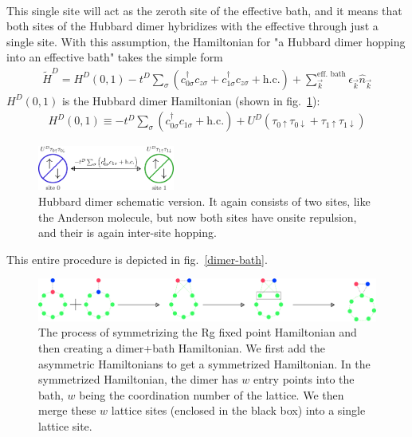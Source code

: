 \documentclass{report}
\numberwithin{equation}{section}
\begin{document}
{\begin{equation}
\begin{aligned}
 \end{aligned}\end{equation}
 This single site will act as the zeroth site of the effective bath, and it means that both sites of the Hubbard dimer hybridizes with the effective through just a single site. With this assumption, the Hamiltonian for "a Hubbard dimer hopping into an effective bath" takes the simple form
 \begin{equation}\begin{aligned}
 	\label{dimer_p_bat}
 	\tilde H^D = H^D(0,1) - t^D \sum_{\sigma}\left(c^\dagger_{0\sigma}c_{z\sigma} + c^\dagger_{1\sigma}c_{z\sigma} + \text{h.c.}\right) + \sum_{\vec k}^\text{eff. bath}\epsilon_{\vec k}\hat n_{\vec k}
 \end{aligned}\end{equation}
 \(H^D(0,1)\) is the Hubbard dimer Hamiltonian (shown in fig.~\ref{hubb-dim}):
 \begin{equation}\begin{aligned}
 	\label{dimer_ham}
 	H^D(0,1) \equiv -t^D\sum_\sigma\left( c^\dagger_{0\sigma}c_{1\sigma} + \text{h.c.} \right) + U^D\left( \tau_{0 \uparrow}\tau_{0 \downarrow} + \tau_{1 \uparrow}\tau_{1 \downarrow}\right)
 \end{aligned}\end{equation}
 \begin{figure}[htpb!]
 	\centering
 	\includegraphics[width=0.4\textwidth]{../figures/hubb_dim.png}
 	\caption{Hubbard dimer schematic version. It again consists of two sites, like the Anderson molecule, but now both sites have onsite repulsion, and their is again inter-site hopping.}
 	\label{hubb-dim}
 \end{figure}
 This entire procedure is depicted in fig.~\ref{dimer-bath}.
 \begin{figure}[htpb]
 	\centering
 	\includegraphics[width=\textwidth]{../figures/dimer_bath.pdf}
 	\caption{The process of symmetrizing the Rg fixed point Hamiltonian and then creating a dimer+bath Hamiltonian. We first add the asymmetric Hamiltonians to get a symmetrized Hamiltonian. In the symmetrized Hamiltonian, the dimer has \(w\) entry points into the bath, \(w\) being the coordination number of the lattice. We then merge these \(w\) lattice sites (enclosed in the black box) into a single lattice site.}

\end{figure}}
\end{document}
